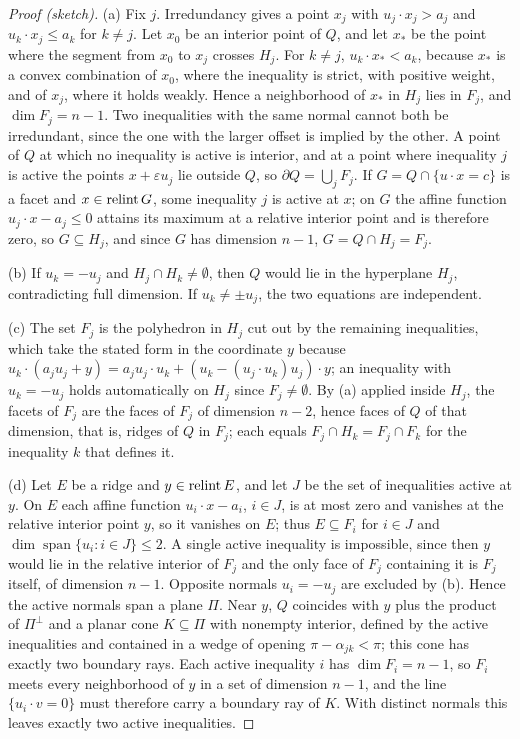 \begin{proof}[Proof (sketch)]
(a) Fix \(j\). Irredundancy gives a point \(x_j\) with \(u_j\cdot x_j>a_j\)
and \(u_k\cdot x_j\le a_k\) for \(k\ne j\). Let \(x_0\) be an interior point of
\(Q\), and let \(x_*\) be the point where the segment from \(x_0\) to \(x_j\)
crosses \(H_j\). For \(k\ne j\), \(u_k\cdot x_*<a_k\), because \(x_*\) is a
convex combination of \(x_0\), where the inequality is strict, with positive
weight, and of \(x_j\), where it holds weakly. Hence a neighborhood of
\(x_*\) in \(H_j\) lies in \(F_j\), and \(\dim F_j=n-1\). Two inequalities
with the same normal cannot both be irredundant, since the one with the
larger offset is implied by the other. A point of \(Q\) at
which no inequality is active is interior, and at a point where
inequality \(j\) is active the points \(x+\varepsilon u_j\) lie outside \(Q\),
so \(\partial Q=\bigcup_jF_j\). If \(G=Q\cap\{u\cdot x=c\}\) is a facet and
\(x\in\operatorname{relint} G\), some inequality \(j\) is active at \(x\); on \(G\) the
affine function \(u_j\cdot x-a_j\le0\) attains its maximum at a relative
interior point and is therefore zero, so \(G\subseteq H_j\), and since \(G\) has
dimension \(n-1\), \(G=Q\cap H_j=F_j\).

(b) If \(u_k=-u_j\) and \(H_j\cap H_k\ne\emptyset\), then \(Q\) would lie in
the hyperplane \(H_j\), contradicting full dimension. If \(u_k\ne\pm u_j\),
the two equations are independent.

(c) The set \(F_j\) is the polyhedron in \(H_j\) cut out by the remaining
inequalities, which take the stated form in the coordinate \(y\) because
\(u_k\cdot(a_ju_j+y)=a_ju_j\cdot u_k+(u_k-(u_j\cdot u_k)u_j)\cdot y\); an
inequality with \(u_k=-u_j\) holds automatically on \(H_j\) since
\(F_j\ne\emptyset\). By (a) applied inside \(H_j\), the facets of \(F_j\) are
the faces of \(F_j\) of dimension \(n-2\), hence faces of \(Q\) of that
dimension, that is, ridges of \(Q\) in \(F_j\); each equals
\(F_j\cap H_k=F_j\cap F_k\) for the inequality \(k\) that defines it.

(d) Let \(E\) be a ridge and \(y\in\operatorname{relint} E\), and let \(J\) be the set of
inequalities active at \(y\). On \(E\) each affine function
\(u_i\cdot x-a_i\), \(i\in J\), is at most zero and vanishes at the relative
interior point \(y\), so it vanishes on \(E\); thus \(E\subseteq F_i\) for
\(i\in J\) and \(\dim\operatorname{span}\{u_i:i\in J\}\le2\). A single active
inequality is impossible, since then \(y\) would lie in the relative interior
of \(F_j\) and the only face of \(F_j\) containing it is \(F_j\) itself, of
dimension \(n-1\). Opposite normals \(u_i=-u_j\) are excluded by (b). Hence
the active normals span a plane \(\Pi\). Near \(y\), \(Q\) coincides with
\(y\) plus the product of \(\Pi^\perp\) and a planar cone \(K\subseteq\Pi\)
with nonempty interior, defined by the active inequalities and contained in
a wedge of opening \(\pi-\alpha_{jk}<\pi\); this cone has exactly two
boundary rays. Each active inequality \(i\) has \(\dim F_i=n-1\), so
\(F_i\) meets every neighborhood of \(y\) in a set of dimension \(n-1\), and
the line \(\{u_i\cdot v=0\}\) must therefore carry a boundary ray of \(K\).
With distinct normals this leaves exactly two active inequalities.
\end{proof}

